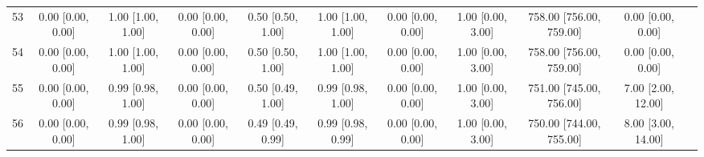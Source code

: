 \documentclass[8pt]{article}
\begin{document}
\begin{center}
\begin{footnotesize}
\begin{longtable}{|ccccccccccc|}
 53 &  0.00 [0.00, 0.00] &  1.00 [1.00, 1.00] &  0.00 [0.00, 0.00] &  0.50 [0.50, 1.00] &  1.00 [1.00, 1.00] &  0.00 [0.00, 0.00] &  1.00 [0.00, 3.00] &  758.00 [756.00, 759.00] &       0.00 [0.00, 0.00] \\
 54 &  0.00 [0.00, 0.00] &  1.00 [1.00, 1.00] &  0.00 [0.00, 0.00] &  0.50 [0.50, 1.00] &  1.00 [1.00, 1.00] &  0.00 [0.00, 0.00] &  1.00 [0.00, 3.00] &  758.00 [756.00, 759.00] &       0.00 [0.00, 0.00] \\
 55 &  0.00 [0.00, 0.00] &  0.99 [0.98, 1.00] &  0.00 [0.00, 0.00] &  0.50 [0.49, 1.00] &  0.99 [0.98, 1.00] &  0.00 [0.00, 0.00] &  1.00 [0.00, 3.00] &  751.00 [745.00, 756.00] &      7.00 [2.00, 12.00] \\
 56 &  0.00 [0.00, 0.00] &  0.99 [0.98, 1.00] &  0.00 [0.00, 0.00] &  0.49 [0.49, 0.99] &  0.99 [0.98, 0.99] &  0.00 [0.00, 0.00] &  1.00 [0.00, 3.00] &  750.00 [744.00, 755.00] &      8.00 [3.00, 14.00] \\
\end{longtable}
\end{footnotesize}
\end{center}
\end{document}
